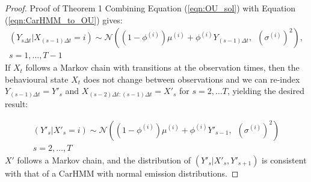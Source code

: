 \begin{proof}{Proof of Theorem 1}{}
Combining Equation (\ref{eqn:OU_sol}) with Equation (\ref{eqn:CarHMM_to_OU}) gives:
%
\begin{align*}
\left(Y_{s \Delta t} | X_{(s-1)\Delta t} = i \right) \sim \mathcal{N}\left((1-\phi^{(i)}) \mu^{(i)} + \phi^{(i)} Y_{(s-1) \Delta t}, \enspace \left(\sigma^{(i)}\right)^2 \right),\\
s = 1, \ldots, T-1
\end{align*}
%
If $X_t$ follows a Markov chain with transitions at the observation times, then the behavioural state $X_t$ does not change between observations and we can re-index $Y_{(s-1) \Delta t} = Y'_s$ and $X_{(s-2)\Delta t: (s-1) \Delta t} = X'_s$ for $s = 2,\ldots T$, yielding the desired result:

\begin{align*}
\left(Y'_s| X'_s = i \right) \sim \mathcal{N}\left((1-\phi^{(i)}) \mu^{(i)} + \phi^{(i)} Y'_{s-1}, \enspace \left(\sigma^{(i)}\right)^2 \right)\\
s = 2, \ldots, T
\end{align*}
%
$X'$ follows a Markov chain, and the distribution of $(Y'_s|X'_s,Y'_{s+1})$ is consistent with that of a CarHMM with normal emission distributions.
\end{proof}


